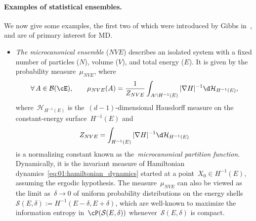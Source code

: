 \paragraph{Examples of statistical ensembles.}
We now give some examples, the first two of which were introduced by Gibbs in~\cite{G02}, and are of primary interest for MD.
\begin{itemize}
    \item{\textit{The microcanonical ensemble} ($NVE$) describes an isolated system with a fixed number of particles ($N$), volume ($V$), and total energy ($E$). It is given by the probability measure~$\mu_{NVE}$, where
    \begin{equation}
        \label{eq:01:microcanonical_distribution}
        \forall\,A\in\mathcal B(\cE),\qquad \mu_{NVE}(A) = \frac1{Z_{NVE}}\int_{A\cap H^{-1}(E)}|\nabla H|^{-1}\d\mathcal{H}_{H^{-1}(E)},
    \end{equation}
    where~$\mathcal{H}_{H^{-1}(E)}$ is the~$(d-1)$-dimensional Hausdorff measure on the constant-energy surface~$H^{-1}(E)$ and
    \[Z_{NVE}=\int_{H^{-1}(E)}|\nabla H|^{-1}\d\mathcal{H}_{H^{-1}(E)}\]
    is a normalizing constant known as the~\textit{microcanonical partition function}. Dynamically, it is the invariant measure of Hamiltonian dynamics~\eqref{eq:01:hamiltonian_dynamics} started at a point~$X_0\in H^{-1}(E)$, assuming the ergodic hypothesis. The measure~$\mu_{NVE}$ can also be viewed as the limit as~$\delta\to 0$ of uniform probability distributions on the energy shells~$\mathcal S(E,\delta):=H^{-1}(E-\delta,E+\delta)$, which are well-known to maximize the information entropy in~$\cP(\mathcal S(E,\delta))$ whenever~$\mathcal S(E,\delta)$ is compact.}


\end{itemize}
